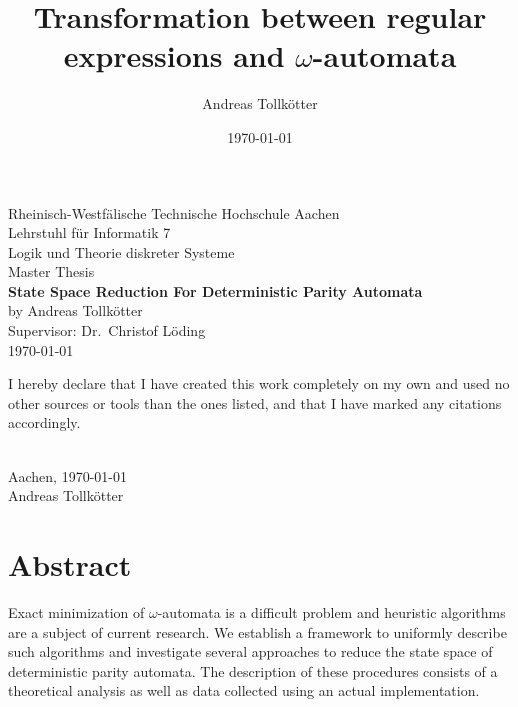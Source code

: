 \title{Transformation between regular expressions and $\omega$-automata}
\author{Andreas Tollkötter}
\date{\today}

\pagestyle{empty}
\begin{titlepage}
\begin{center}
	\vspace*{\fill}
		\LARGE Rheinisch-Westfälische Technische Hochschule Aachen \\
	\vspace*{1cm}
		\LARGE Lehrstuhl für Informatik 7 \\
		\Large Logik und Theorie diskreter Systeme \\
	\vspace*{2cm}
		\LARGE Master Thesis \\
	\vspace*{5mm}
		\huge \textbf{State Space Reduction For Deterministic Parity Automata} \\
	\vspace*{1cm}
		\Large by Andreas Tollkötter \\
	\vspace*{5mm}
		\Large Supervisor: Dr.\ Christof Löding \\
	\vspace*{2cm}
		\large \today 
	\vspace*{\fill}
\end{center}
\end{titlepage}



\par\vspace*{\fill}
\noindent
I hereby declare that I have created this work completely on
my own and used no other sources or tools than the ones
listed, and that I have marked any citations accordingly. \\
\vspace*{1cm}

\begin{flushright}
\underline{\hspace{5cm}} \\
Aachen, \today \\
Andreas Tollkötter
\end{flushright}



\chapter*{Abstract}
Exact minimization of $\omega$-automata is a difficult problem and heuristic algorithms are a subject of current research. We establish a framework to uniformly describe such algorithms and investigate several approaches to reduce the state space of deterministic parity automata. The description of these procedures consists of a theoretical analysis as well as data collected using an actual implementation.



